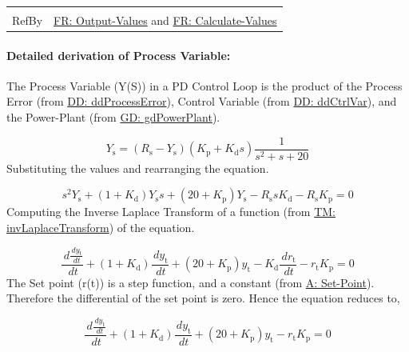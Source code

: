 \documentclass[12pt]{article}
\begin{document}
\begin{minipage}{\textwidth}
\begin{tabular}{>{\raggedright}p{}>{\raggedright\arraybackslash}p{}}
\\ \midrule \\
RefBy & \hyperref[outputValues]{FR: Output-Values} and \hyperref[calculateValues]{FR: Calculate-Values}
        
\\ \bottomrule
\end{tabular}
\end{minipage}
\paragraph{Detailed derivation of Process Variable:}
\label{IM:pdEquationIMDeriv}
The Process Variable (Y(S)) in a PD Control Loop is the product of the Process Error (from \hyperref[DD:ddProcessError]{DD: ddProcessError}), Control Variable (from \hyperref[DD:ddCtrlVar]{DD: ddCtrlVar}), and the Power-Plant (from \hyperref[GD:gdPowerPlant]{GD: gdPowerPlant}).

\begin{displaymath}
{Y_{\text{s}}}=\left({R_{\text{s}}}-{Y_{\text{s}}}\right) \left({K_{\text{p}}}+{K_{\text{d}}} s\right) \frac{1}{s^{2}+s+20}
\end{displaymath}
Substituting the values and rearranging the equation.

\begin{displaymath}
s^{2} {Y_{\text{s}}}+\left(1+{K_{\text{d}}}\right) {Y_{\text{s}}} s+\left(20+{K_{\text{p}}}\right) {Y_{\text{s}}}-{R_{\text{s}}} s {K_{\text{d}}}-{R_{\text{s}}} {K_{\text{p}}}=0
\end{displaymath}
Computing the Inverse Laplace Transform of a function (from \hyperref[TM:invLaplaceTransform]{TM: invLaplaceTransform}) of the equation.

\begin{displaymath}
\frac{\,d\frac{\,d{y_{\text{t}}}}{\,dt}}{\,dt}+\left(1+{K_{\text{d}}}\right) \frac{\,d{y_{\text{t}}}}{\,dt}+\left(20+{K_{\text{p}}}\right) {y_{\text{t}}}-{K_{\text{d}}} \frac{\,d{r_{\text{t}}}}{\,dt}-{r_{\text{t}}} {K_{\text{p}}}=0
\end{displaymath}
The Set point (r(t)) is a step function, and a constant (from \hyperref[setPoint]{A: Set-Point}). Therefore the differential of the set point is zero. Hence the equation reduces to,

\begin{displaymath}
\frac{\,d\frac{\,d{y_{\text{t}}}}{\,dt}}{\,dt}+\left(1+{K_{\text{d}}}\right) \frac{\,d{y_{\text{t}}}}{\,dt}+\left(20+{K_{\text{p}}}\right) {y_{\text{t}}}-{r_{\text{t}}} {K_{\text{p}}}=0
\end{displaymath}
\end{document}
